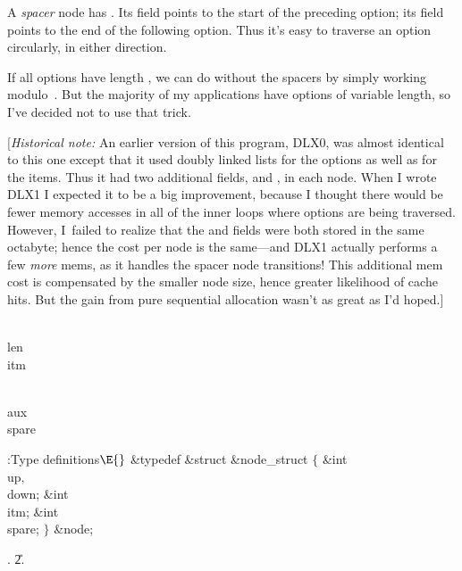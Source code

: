 A {\it spacer\/} node has . Its  field points
to the start
of the preceding option; its  field points to the end of the
following option.
Thus it's easy to traverse an option circularly, in either direction.

If all options have length , we can do without the spacers by simply
working modulo~. But the majority of my applications have options of
variable length, so I've decided not to use that trick.

[{\it Historical note:\/} An earlier version of this program, {\mc DLX0},
was almost identical to this one except that it used doubly linked lists
for the options as well as for the items. Thus it had two additional
fields,  and , in each node. When I wrote {\mc DLX1}
I expected
it to be a big improvement, because I thought there would be fewer memory
accesses in all of the inner loops where options are being traversed. However,
I~failed to realize that the  and  fields were both
stored in the
same octabyte; hence the cost per node is the same---and
{\mc DLX1} actually performs a few {\it more\/} mems, as
it handles the spacer node transitions! This additional mem cost is
compensated by the smaller node size, hence greater likelihood of cache hits.
But the gain from pure sequential allocation wasn't as great as I'd hoped.]

\Y\B\4\D\\{len}\5
\\{itm}\par
\B\4\D\\{aux}\5
\\{spare}\par
\Y\B\4:Type definitions\X${}\E{}$\6
\&{typedef} \&{struct} \&{node\_struct} ${}\{{}$\1\6
\&{int} \\{up}${},{}$ \\{down};\6
\&{int} \\{itm};\6
\&{int} \\{spare};\2\6
${}\}{}$ \&{node};\par
{}.
\U2.\fi

